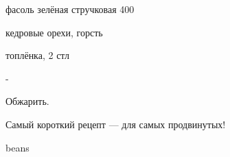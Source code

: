 {
\item фасоль зелёная стручковая 400
\item кедровые орехи, горсть
\item топлёнка, 2 стл
}{
\item -
}{
Обжарить.
}{
\begin{advice}
\item Самый короткий рецепт — для самых продвинутых!
\end{advice}}{beans}





